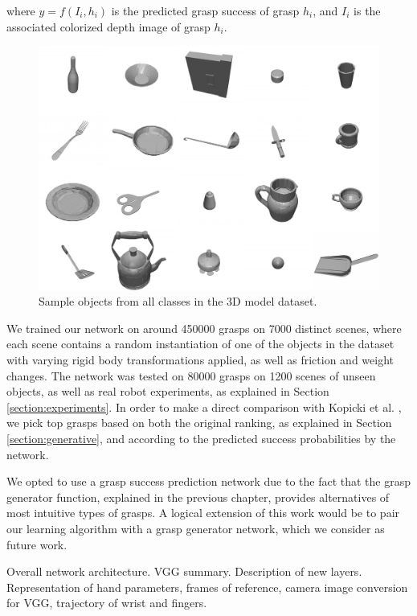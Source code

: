 where $y = f(I_i, h_i)$ is the predicted grasp success of grasp $h_i$, and $I_i$ is the associated colorized depth image of grasp $h_i$.
\begin{figure}
  \includegraphics[width=\linewidth]{images/allObjects.pdf}
  \caption{Sample objects from all classes in the 3D model dataset.}
  \label{fig:allObjects}
\end{figure}
We trained our network on around 450000 grasps on 7000 distinct scenes, where each scene contains a random instantiation of one of the objects in the dataset with varying rigid body transformations applied, as well as friction and weight changes. The network was tested on 80000 grasps on 1200 scenes of unseen objects, as well as real robot experiments, as explained in Section \ref{section:experiments}. In order to make a direct comparison with Kopicki et al. \cite{kopicki2015ijrr}, we pick top grasps based on both the original ranking, as explained in Section \ref{section:generative}, and according to the predicted success probabilities by the network. 

We opted to use a grasp success prediction network due to the fact that the grasp generator function, explained in the previous chapter, provides alternatives of most intuitive types of grasps. A logical extension of this work would be to pair our learning algorithm with a grasp generator network, which we consider as future work.

Overall network architecture. VGG summary. Description of new layers. Representation of hand parameters, frames of reference, camera image conversion for VGG, trajectory of wrist and fingers.